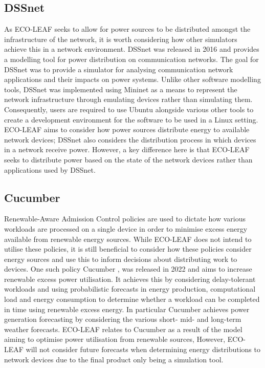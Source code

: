 \documentclass{l4proj}
\begin{document}
\subsection{DSSnet}
As ECO-LEAF seeks to allow for power sources to be distributed amongst the infrastructure of the network, it is worth considering how other simulators achieve this in a network environment.
DSSnet \citep{dssNet} was released in 2016 and provides a modelling tool for power distribution on communication networks.
The goal for DSSnet was to provide a simulator for analysing communication network applications and their impacts on power systems.
Unlike other software modelling tools, DSSnet was implemented using Mininet \citep{mininet} as a means to represent the network infrastructure through emulating devices rather than simulating them.
Consequently, users are required to use Ubuntu alongside various other tools to create a development environment for the software to be used in a Linux setting.
ECO-LEAF aims to consider how power sources distribute energy to available network devices; DSSnet also considers the distribution process in which devices in a network receive power.
However, a key difference here is that ECO-LEAF seeks to distribute power based on the state of the network devices rather than applications used by DSSnet.

\subsection{Cucumber}
Renewable-Aware Admission Control policies are used to dictate how various workloads are processed on a single device in order to minimise excess energy available from renewable energy sources.
While ECO-LEAF does not intend to utilise these policies, it is still beneficial to consider how these policies consider energy sources and use this to inform decisions about distributing work to devices.
One such policy Cucumber \citep{cucumber}, was released in 2022 and aims to increase renewable excess power utilisation.
It achieves this by considering delay-tolerant workloads and using probabilistic forecasts in energy production, computational load and energy consumption to determine whether a workload can be completed in time using renewable excess energy.
In particular Cucumber achieves power generation forecasting by considering the various short- mid- and long-term weather forecasts.
ECO-LEAF relates to Cucumber as a result of the model aiming to optimise power utilisation from renewable sources,
However, ECO-LEAF will not consider future forecasts when determining energy distributions to network devices due to the final product only being a simulation tool.
\end{document}
